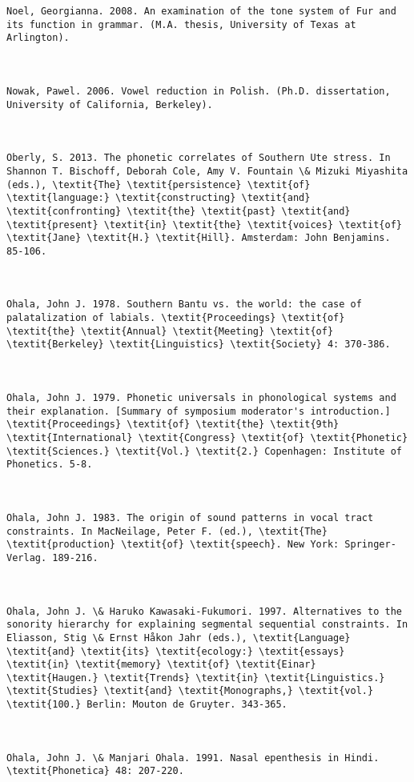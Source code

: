 \begin{verbatim}
Noel, Georgianna. 2008. An examination of the tone system of Fur and its function in grammar. (M.A. thesis, University of Texas at Arlington).



Nowak, Pawel. 2006. Vowel reduction in Polish. (Ph.D. dissertation, University of California, Berkeley).



Oberly, S. 2013. The phonetic correlates of Southern Ute stress. In Shannon T. Bischoff, Deborah Cole, Amy V. Fountain \& Mizuki Miyashita (eds.), \textit{The} \textit{persistence} \textit{of} \textit{language:} \textit{constructing} \textit{and} \textit{confronting} \textit{the} \textit{past} \textit{and} \textit{present} \textit{in} \textit{the} \textit{voices} \textit{of} \textit{Jane} \textit{H.} \textit{Hill}. Amsterdam: John Benjamins. 85-106.



Ohala, John J. 1978. Southern Bantu vs. the world: the case of palatalization of labials. \textit{Proceedings} \textit{of} \textit{the} \textit{Annual} \textit{Meeting} \textit{of} \textit{Berkeley} \textit{Linguistics} \textit{Society} 4: 370-386. 



Ohala, John J. 1979. Phonetic universals in phonological systems and their explanation. [Summary of symposium moderator's introduction.] \textit{Proceedings} \textit{of} \textit{the} \textit{9th} \textit{International} \textit{Congress} \textit{of} \textit{Phonetic} \textit{Sciences.} \textit{Vol.} \textit{2.} Copenhagen: Institute of Phonetics. 5-8.



Ohala, John J. 1983. The origin of sound patterns in vocal tract constraints. In MacNeilage, Peter F. (ed.), \textit{The} \textit{production} \textit{of} \textit{speech}. New York: Springer-Verlag. 189-216.



Ohala, John J. \& Haruko Kawasaki-Fukumori. 1997. Alternatives to the sonority hierarchy for explaining segmental sequential constraints. In Eliasson, Stig \& Ernst Håkon Jahr (eds.), \textit{Language} \textit{and} \textit{its} \textit{ecology:} \textit{essays} \textit{in} \textit{memory} \textit{of} \textit{Einar} \textit{Haugen.} \textit{Trends} \textit{in} \textit{Linguistics.} \textit{Studies} \textit{and} \textit{Monographs,} \textit{vol.} \textit{100.} Berlin: Mouton de Gruyter. 343-365.



Ohala, John J. \& Manjari Ohala. 1991. Nasal epenthesis in Hindi. \textit{Phonetica} 48: 207-220.




\end{verbatim}
